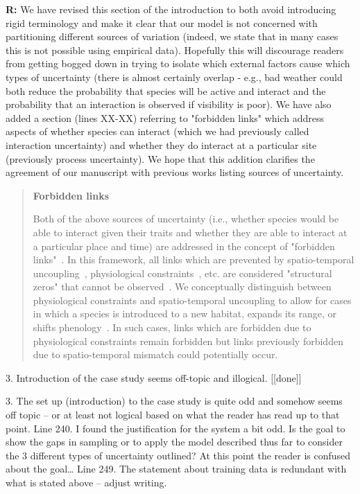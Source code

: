 \documentclass[12pt]{letter}
\newenvironment{refquote}{\bigskip \begin{it}}{\end{it}\smallskip}
\begin{document}
		\textbf{R:} We have revised this section of the introduction to both avoid introducing rigid terminology and make it clear that our model is not concerned with partitioning different sources of variation (indeed, we state that in many cases this is not possible using empirical data). Hopefully this will discourage readers from getting bogged down in trying to isolate which external factors cause which types of uncertainty (there is almost certainly overlap - e.g., bad weather could both reduce the probability that species will be active and interact and the probability that an interaction is observed if visibility is poor). We have also added a section (lines XX-XX) referring to "forbidden links" which address aspects of whether species can interact (which we had previously called interaction uncertainty) and whether they do interact at a particular site (previously process uncertainty). We hope that this addition clarifies the agreement of our manuscript with previous works listing sources of uncertainty.

			\begin{quotation}

        \textbf{Forbidden links}

            Both of the above sources of uncertainty (i.e., whether species would be able to interact given their traits and whether they are able to interact at a particular place and time) are addressed in the concept of "forbidden links"~\citep{Jordano2016}. In this framework, all links which are prevented by spatio-temporal uncoupling~\citep{Jordano1987}, physiological constraints~\citep{Jordano1987,More2012}, etc. are considered "structural zeros" that cannot be observed~\citep{Jordano2016}. We conceptually distinguish between physiological constraints and spatio-temporal uncoupling to allow for cases in which a species is introduced to a new habitat, expands its range, or shifts phenology~\citep{Gravel2013}. In such cases, links which are forbidden due to physiological constraints remain forbidden but links previously forbidden due to spatio-temporal mismatch could potentially occur. 

      \end{quotation}


	3. Introduction of the case study seems off-topic and illogical. [[done]]

		\begin{refquote}
		3.      The set up (introduction) to the case study is quite odd and somehow seems off topic – or at least not logical based on what the reader has read up to that point.
		\medskip
		Line 240.  I found the justification for the system a bit odd.  Is the goal to show the gaps in sampling or to apply the model described thus far to consider the 3 different types of uncertainty outlined?  At this point the reader is confused about the goal…
		\medskip
		Line 249.  The statement about training data is redundant with what is stated above – adjust writing.
		\end{refquote}
\end{document}
